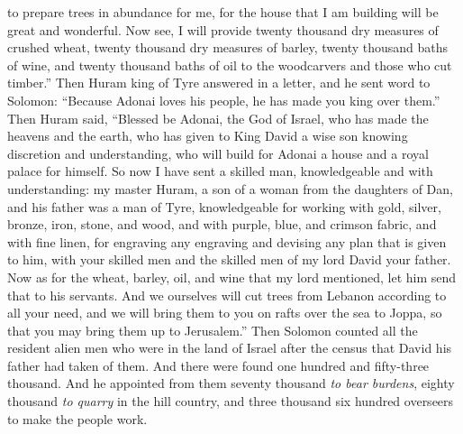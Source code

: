 \begin{biblechapter}
\verse to prepare trees in abundance for me, for the house that I am building will be great and wonderful.
\verse Now see, I will provide twenty thousand dry measures of crushed wheat, twenty thousand dry measures of barley, twenty thousand baths of wine, and twenty thousand baths of oil to the woodcarvers and those who cut timber.”
\verse Then Huram king of Tyre answered in a letter, and he sent word to Solomon: “Because Adonai loves his people, he has made you king over them.”
\verse Then Huram said, “Blessed be Adonai, the God of Israel, who has made the heavens and the earth, who has given to King David a wise son knowing discretion and understanding, who will build for Adonai a house and a royal palace for himself.
\verse So now I have sent a skilled man, knowledgeable and with understanding: my master Huram,
\verse a son of a woman from the daughters of Dan, and his father was a man of Tyre, knowledgeable for working with gold, silver, bronze, iron, stone, and wood, and with purple, blue, and crimson fabric, and with fine linen, for engraving any engraving and devising any plan that is given to him, with your skilled men and the skilled men of my lord David your father.
\verse Now as for the wheat, barley, oil, and wine that my lord mentioned, let him send that to his servants.
\verse And we ourselves will cut trees from Lebanon according to all your need, and we will bring them to you on rafts over the sea to Joppa, so that you may bring them up to Jerusalem.”
\verse Then Solomon counted all the resident alien men who were in the land of Israel after the census that David his father had taken of them. And there were found one hundred and fifty-three thousand.
\verse And he appointed from them seventy thousand \textit{to bear burdens}, eighty thousand \textit{to quarry} in the hill country, and three thousand six hundred overseers to make the people work.
\end{biblechapter}

